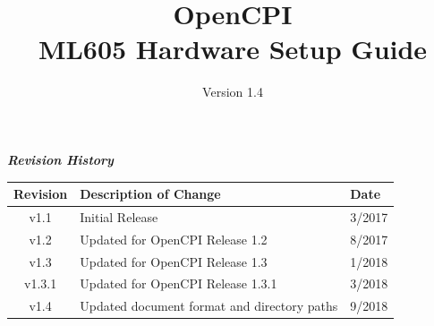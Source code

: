 \def\docTitle{OpenCPI\\ ML605 Hardware Setup Guide}
\def\docVersion{1.4}

\date{Version \docVersion} %
\title{\docTitle}
\usepackage{graphicx}
\graphicspath{ {figures/} }
\usepackage{textcomp}
\newcommand{\shellcmd}[1]{\texttt{\$ #1\\}}

\maketitle
\newpage
	\begin{center}
	\textit{\textbf{Revision History}}
		\begin{table}[H]
		\label{table:revisions} %
			\begin{tabularx}{\textwidth}{|c|X|l|}
			\hline
			\rowcolor{blue}
			\textbf{Revision} & \textbf{Description of Change} & \textbf{Date} \\
		    \hline
		    v1.1 & Initial Release & 3/2017 \\
		    \hline
		    v1.2 & Updated for OpenCPI Release 1.2 & 8/2017 \\
			\hline
			v1.3 & Updated for OpenCPI Release 1.3 & 1/2018 \\
			\hline
			v1.3.1 & Updated for OpenCPI Release 1.3.1 & 3/2018 \\
			\hline
			v1.4 & Updated document format and directory paths & 9/2018 \\
			\hline
			\end{tabularx}
		\end{table}
	\end{center}
\newpage
\tableofcontents
\pagebreak
